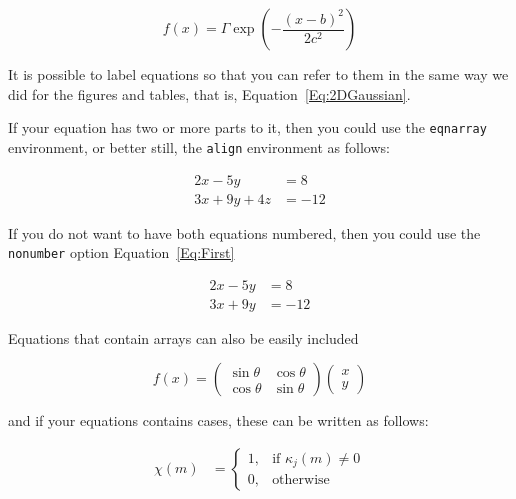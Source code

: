 \begin{equation}
f\left(x\right) = \Gamma \exp{\left(- { \frac{(x-b)^2 }{ 2 c^2} } \right)}
\end{equation}


\noindent It is possible to label equations so that you can refer to them in the same way we did for the figures and tables, that is,  Equation~\ref{Eq:2DGaussian}.

If your equation has two or more parts to it, then you could use the \texttt{eqnarray} environment, or better still, the \texttt{align} environment as follows:

\begin{align}
2x - 5y &=  8 \nonumber\\
3x + 9y + 4z &=  -12 \label{Eq:First}
\end{align}

\noindent If you do not want to have both equations numbered, then you could use the \texttt{nonumber} option Equation~\ref{Eq:First}

\begin{align}
\nonumber 2x - 5y &=  8 \\
3x + 9y &=  -12
\end{align}

Equations that contain arrays can also be easily included

\begin{equation}\label{Eq:array}
  f(x)  =  \left(\begin{array}{cc}
                                \sin \theta & \cos \theta \\
                                \cos \theta & \sin \theta \end{array}\right)
                                 \left(\begin{array}{c}
                                x \\
                                y \end{array}\right)
\end{equation}

\noindent and if your equations contains cases, these can be written as follows:

\begin{align}
\chi(m)  &= \begin{cases}
    1, & \text{if }   \kappa_j(m)  \neq 0\\
    0, & \text{otherwise}
\end{cases}
\end{align}

